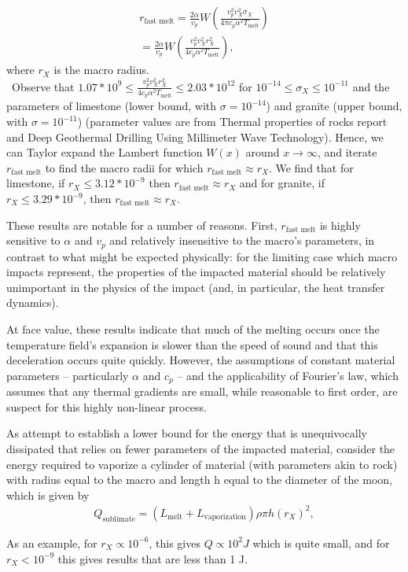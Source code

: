\documentclass[prd,reprint,10pt]{revtex4-1}
\newcommand*\te[1]{\text{#1}}
\newcommand*\p[1]{\left(#1\right)}
\begin{document}
\begin{multline}
r_\te{fast melt} =  \frac{2\alpha}{v_p}W\p{\frac{v_p^2 v_X^2 \sigma_X}{4 \pi c_p \alpha^2 T_\te{melt}}}
\\
= \frac{2\alpha}{v_p}W\p{\frac{v_p^2 v_X^2 r_X^2}{4 c_p \alpha^2 T_\te{melt}}},
\end{multline}
where $r_X$ is the macro radius.
\\\
Observe that $ 1.07*10^9 \leq \frac{v_p^2 v_X^2 r_X^2}{4 c_p \alpha^2 T_\te{melt}} \leq 2.03*10^{12}$ for $10^{-14} \leq \sigma_X \leq 10^{-11}$ and the parameters of limestone (lower bound, with $\sigma =10^{-14}$) and granite (upper bound, with $\sigma = 10^{-11}$) (parameter values are from Thermal properties of rocks report and Deep Geothermal Drilling Using Millimeter Wave Technology).  Hence, we can Taylor expand the Lambert function $W(x)$ around $x\to \infty$, and iterate $r_\te{fast melt}$ to find the macro radii for which $r_\te{fast melt} \approx r_X$.  We find that for limestone, if $r_X \leq 3.12*10^{-9}$ then $r_\te{fast melt} \approx r_X$ and for granite, if $r_X \leq 3.29*10^{-9}$, then $r_\te{fast melt} \approx r_X$.

These results are notable for a number of reasons. First, $r_\te{fast melt}$ is highly sensitive to $\alpha$ and $v_p$ and relatively insensitive to the macro's parameters, in contrast to what might be expected physically: for the limiting case which macro impacts represent, the properties of the impacted material should be relatively unimportant in the physics of the impact (and, in particular, the heat transfer dynamics).

At face value, these results indicate that much of the melting occurs once the temperature field's expansion is slower than the speed of sound and that this deceleration occurs quite quickly.  However, the assumptions of constant material parameters -- particularly $\alpha$ and $c_p$ -- and the applicability of Fourier's law, which assumes that any thermal gradients are small, while reasonable to first order, are suspect for this highly non-linear process.

As attempt to establish a lower bound for the energy that is unequivocally dissipated that relies on fewer parameters of the impacted material, consider the energy required to vaporize a cylinder of material (with parameters akin to rock) with radius equal to the macro and length h equal to the diameter of the moon, which is given by
\begin{align}
Q_\te{sublimate} = (L_\te{melt} + L_\te{vaporization})\rho \pi h(r_X)^2,
\end{align}

As an example, for $r_X \propto 10^{-6}$, this gives $Q \propto 10^2 J$ which is quite small, and for $r_X < 10^{-9}$ this gives results that are less than 1 J.

{}

\end{document}
